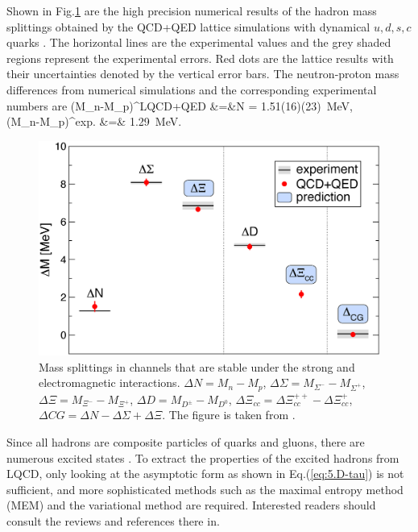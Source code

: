 Shown in Fig.\ref{fig:pn-mass} are the high precision numerical
 results of the hadron mass splittings obtained by the QCD+QED lattice
 simulations with dynamical $u,d,s,c$ quarks \cite{Borsanyi:2014jba}.
 The horizontal lines are the experimental values and the grey shaded
 regions represent the experimental errors.  Red dots are the lattice
 results with their uncertainties denoted by the vertical error bars.
 The neutron-proton mass differences from numerical simulations and
 the corresponding experimental numbers are
\beq
(M_n-M_p)^{\rm LQCD+QED} &=&\Delta N = 1.51(16)(23)\   {\rm MeV}, \\
(M_n-M_p)^{\rm exp.} &=& 1.29\   {\rm MeV}. 
\eeq

\begin{figure}[t]
\begin{center}
\includegraphics[scale=0.2]{Chapter3-figures/pn-mass.eps}
 \end{center}
\caption{Mass splittings in channels that are stable under the strong and electromagnetic interactions.
$\Delta N=M_n-M_p$, $\Delta \Sigma = M_{\Sigma^-}- M_{\Sigma^+}$,
$\Delta \Xi =M_{\Xi^-}- M_{\Xi^+}$,
$\Delta D= M_{D^{\pm}} - M_{D^0}$,
$\Delta \Xi_{cc} = \Delta \Xi_{cc}^{++} - \Delta \Xi_{cc}^{+}$,
$\Delta CG = \Delta N-\Delta \Sigma + \Delta \Xi$.
The figure is taken from
\cite{Borsanyi:2014jba}.
  }
\label{fig:pn-mass}
\end{figure}

Since all hadrons are composite particles of quarks and gluons, there
are numerous excited states \cite{RPP}.  To extract the properties of
the excited hadrons from LQCD, only looking at the asymptotic form as
shown in Eq.(\ref{eq:5.D-tau}) is not sufficient, and more
sophisticated methods such as the maximal entropy method (MEM) and the
variational method are required.  Interested readers should consult
the reviews \cite{Asakawa:2000tr,Fodor:2012gf} and references there
in.


